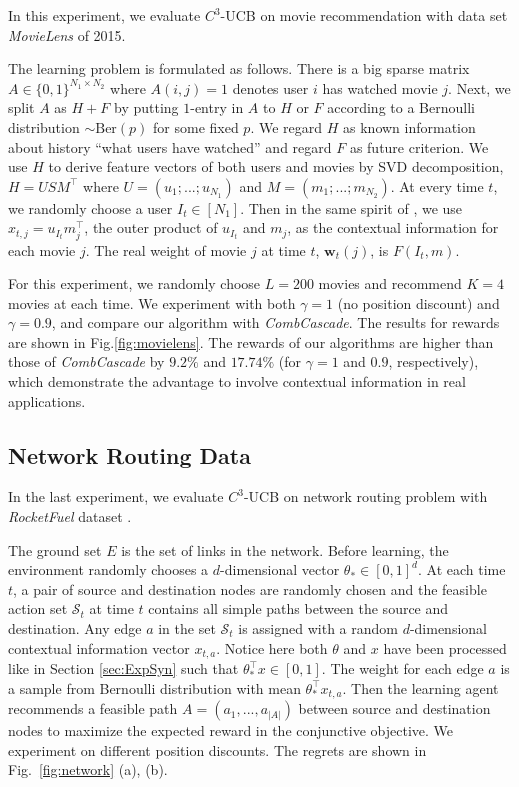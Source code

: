 \documentclass{article}
\newcommand{\bw}{\mathbf{w}}
\newcommand{\cS}{\mathcal{S}}
\begin{document}
In this experiment, we evaluate $C^3$-UCB on movie recommendation with data set {\it MovieLens} \cite{lam2013movie} of 2015.

The learning problem is formulated as follows. There is a big sparse matrix $A \in \{0,1\}^{N_1 \times N_2}$ where $A(i,j) = 1$ denotes user $i$ has watched movie $j$. Next, we split $A$ as $H + F$ by putting $1$-entry in $A$ to $H$ or $F$ according to a Bernoulli distribution $\sim \mathrm{Ber}(p)$ for some fixed $p$. We regard $H$ as known information about history ``what users have watched'' and regard $F$ as future criterion. We use $H$ to derive feature vectors of both users and movies by SVD decomposition, $H = USM^{\top}$ where $U = (u_1; ...;u_{N_1})$ and $M = (m_1;...;m_{N_2})$. At every time $t$, we randomly choose a user $I_t \in [N_1]$. Then in the same spirit of \cite{li2010contextual}, we use $x_{t,j} = u_{I_t}m_j^{\top}$, the outer product of $u_{I_t}$ and $m_{j}$, as the contextual information for each movie $j$. The real weight of movie $j$ at time $t$, $\bw_t(j)$, is $F(I_t,m)$.

For this experiment, we randomly choose $L=200$ movies and recommend $K=4$ movies at each time. We experiment with both $\gamma=1$ (no position discount) and $\gamma=0.9$, and compare our algorithm with {\it CombCascade}. The results for rewards are shown in Fig.\ref{fig:movielens}. The rewards of our algorithms are higher than those of {\it CombCascade} by $9.2\%$ and $17.74\%$ (for $\gamma = 1$ and $0.9$, respectively), which demonstrate the advantage to involve contextual information in real applications.

\subsection{Network Routing Data}

In the last experiment, we evaluate $C^3$-UCB on network routing problem with {\it RocketFuel} dataset \cite{spring2004measuring}.

The ground set $E$ is the set of links in the network. Before learning, the environment randomly chooses a $d$-dimensional vector $\theta_* \in [0,1]^d$. At each time $t$, a pair of source and destination nodes are randomly chosen and the feasible action set $\cS_t$ at time $t$ contains all simple paths between the source and destination. Any edge $a$ in the set $\cS_t$ is assigned with a random $d$-dimensional contextual information vector $x_{t,a}$. Notice here both $\theta$ and $x$ have been processed like in Section \ref{sec:ExpSyn} such that $\theta_*^{\top}x \in [0,1]$. The weight for each edge $a$ is a sample from Bernoulli distribution with mean $\theta_*^{\top}x_{t,a}$. Then the learning agent recommends a feasible path $A = (a_1,...,a_{|A|})$ between source and destination nodes to maximize the expected reward in the conjunctive objective. We experiment on different position discounts. The regrets are shown in Fig.~\ref{fig:network} (a), (b). 
\end{document}

